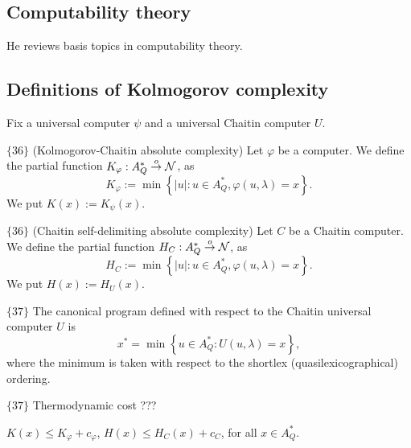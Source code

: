 \documentclass{article}
\begin{document}
\subsection{Computability theory}

He reviews basis topics in computability theory.

\subsection{Definitions of Kolmogorov complexity}

Fix a universal computer $\psi$ and a universal Chaitin computer $U$.

\begin{definition}$\{36\}$ (Kolmogorov-Chaitin absolute complexity)
    Let $\varphi$ be a computer. We define the partial function $K_\varphi : A_Q^\ast \overset{o}{\to} \mathcal{N}$, as 
    \begin{equation}
        K_\varphi := \min \left\{ |u| : u \in A_Q^\ast, \varphi(u,\lambda) = x \right\}.
    \end{equation}
    We put $K(x) := K_\psi(x)$.
\end{definition}

\begin{definition}$\{36\}$ (Chaitin self-delimiting absolute complexity)
    Let $C$ be a Chaitin computer. We define the partial function $H_C: A_Q^\ast \overset{o}{\to} \mathcal{N}$, as 
    \begin{equation}
        H_C := \min \left\{ |u| : u \in A_Q^\ast, \varphi(u,\lambda) = x \right\}.
    \end{equation}
    We put $H(x) := H_U(x)$.
\end{definition}

\begin{definition}$\{37\}$
    The canonical program defined with respect to the Chaitin universal computer $U$ is 
    \begin{equation}
        x^\ast = \min \left\{ u \in A_Q^\ast : U(u,\lambda) = x\right\},
    \end{equation}
    where the minimum is taken with respect to the shortlex (quasilexicographical) ordering.
\end{definition}

$\{37\}$ Thermodynamic cost ???

\begin{lemma}
    $K(x) \leq K_\varphi + c_\varphi$, $H(x) \leq H_C(x) + c_C$, for all $x \in A_Q^\ast$.
\end{lemma}
\end{document}
